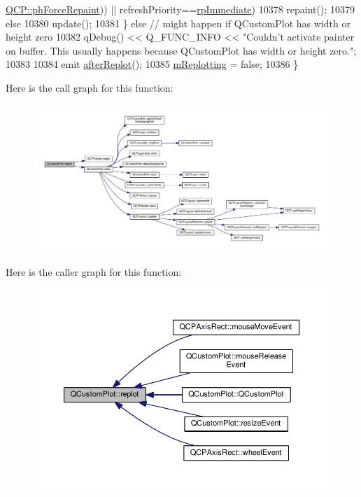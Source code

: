 \begin{DoxyCode}
      \hyperlink{namespace_q_c_p_a5400e5fcb9528d92002ddb938c1f4ef4aa3090dafa0e0f9a28c579c79d6c2d283}{QCP::phForceRepaint})) || refreshPriority==\hyperlink{class_q_custom_plot_a45d61392d13042e712a956d27762aa39a0d4831572370d871f2b7cb88806bac59}{rpImmediate})
10378       repaint();
10379     \textcolor{keywordflow}{else}
10380       update();
10381   \} \textcolor{keywordflow}{else} \textcolor{comment}{// might happen if QCustomPlot has width or height zero}
10382     qDebug() << Q\_FUNC\_INFO << \textcolor{stringliteral}{"Couldn't activate painter on buffer. This usually happens because
       QCustomPlot has width or height zero."};
10383   
10384   emit \hyperlink{class_q_custom_plot_a6f4fa624af060bc5919c5f266cf426a0}{afterReplot}();
10385   \hyperlink{class_q_custom_plot_ab30daeca6612c3948afd368dce5f1c39}{mReplotting} = \textcolor{keyword}{false};
10386 \}
\end{DoxyCode}


Here is the call graph for this function\+:\nopagebreak
\begin{figure}[H]
\begin{center}
\leavevmode
\includegraphics[width=350pt]{class_q_custom_plot_a606fd384b2a637ce2c24899bcbde77d6_cgraph}
\end{center}
\end{figure}




Here is the caller graph for this function\+:\nopagebreak
\begin{figure}[H]
\begin{center}
\leavevmode
\includegraphics[width=350pt]{class_q_custom_plot_a606fd384b2a637ce2c24899bcbde77d6_icgraph}
\end{center}
\end{figure}


